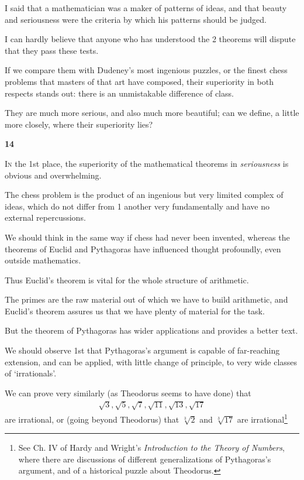 \documentclass{article}
\numberwithin{equation}{section}
\begin{document}
%
I said that a mathematician was a maker of patterns of ideas, and that beauty and seriousness were the criteria by which his patterns should be judged.

I can hardly believe that anyone who has understood the 2 theorems will dispute that they pass these tests.

If we compare them with Dudeney's most ingenious puzzles, or the finest chess problems that masters of that art have composed, their superiority in both respects stands out: there is an unmistakable difference of class.

They are much more serious, and also much more beautiful; can we define, a little more closely, where their superiority lies?

\begin{center}
    \large\textbf{14}
\end{center}
\textsc{In} the 1st place, the superiority of the mathematical theorems in \textit{seriousness} is obvious and overwhelming.

The chess problem is the product of an ingenious but very limited complex of ideas, which do not differ from 1 another very fundamentally and have no external repercussions.

We should think in the same way if chess had never been invented, whereas the theorems of Euclid and Pythagoras have influenced thought profoundly, even outside mathematics.

%
Thus Euclid's theorem is vital for the whole structure of arithmetic.

The primes are the raw material out of which we have to build arithmetic, and Euclid's theorem assures us that we have plenty of material for the task.

But the theorem of Pythagoras has wider applications and provides a better text.

%
We should observe 1st that Pythagoras's argument is capable of far-reaching extension, and can be applied, with little change of principle, to very wide classes of `irrationals'.

We can prove very similarly (as Theodorus seems to have done) that
\begin{align*}
    \sqrt{3},\sqrt{5},\sqrt{7},\sqrt{11},\sqrt{13},\sqrt{17}
\end{align*}
are irrational, or (going beyond Theodorus) that $\sqrt[3]{2}$ and $\sqrt[3]{17}$ are irrational\footnote{See Ch. IV of Hardy and Wright's \textit{Introduction to the Theory of Numbers}, where there are discussions of different generalizations of Pythagoras's argument, and of a historical puzzle about Theodorus.}
\end{document}
